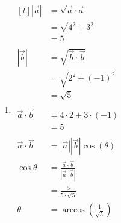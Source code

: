 \documentclass[11pt,fleqn]{book} %
\begin{document}
\begin{minipage}[t]{0.45\linewidth}
    \begin{enumerate}
        \item 
        $\begin{aligned}[t]
            | \vec{a} |           & = \sqrt{\vec{a} \cdot \vec{a}}                          \\
                                  & = \sqrt{4^2 + 3^2}                                      \\
                                  & = 5
            \\ \\
            | \vec{b} |           & = \sqrt{\vec{b} \cdot \vec{b}}                          \\
                                  & = \sqrt{2^2 + (-1)^2}                                   \\
                                  & = \sqrt{5}
            \\ \\
            \vec{a} \cdot \vec{b} & = 4 \cdot 2 + 3 \cdot (-1)                              \\
                                  & = 5
            \\ \\
            \vec{a} \cdot \vec{b} & = | \vec{a} | | \vec{b} | \cos(\theta)                  \\
            \cos \theta           & = \frac{\vec{a} \cdot \vec{b}}{| \vec{a} | | \vec{b} |} \\
                                  & = \frac{5}{5 \cdot \sqrt{5}}                            \\
            \theta                & = \arccos \left( \frac{1}{\sqrt{5}} \right)
        \end{aligned}$
    \end{enumerate}
\end{minipage}
\end{document}
